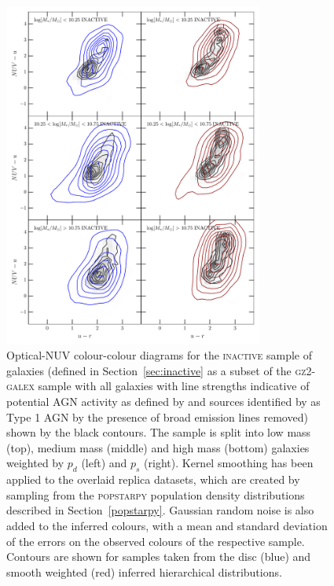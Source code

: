 \begin{figure}
\begin{centering}
\includegraphics[width=0.76\textwidth]{starpy/figc3b.pdf}
\caption[Replica colour-colour distributions using the \textsc{popstarpy} method]{Optical-NUV colour-colour diagrams for the \textsc{inactive} {\minor sample of galaxies (defined in Section~\ref{sec:inactive} as a subset of the \textsc{gz2-galex} sample with all galaxies with line strengths indicative of potential AGN activity as defined by \citealt{kauffmann03b} and sources identified by \citealt{Oh15} as Type 1 AGN by the presence of broad emission lines removed)} shown by the black contours. The sample is split into low mass (top), medium mass (middle) and high mass (bottom) galaxies weighted by $p_d$ (left) and $p_s$ (right). Kernel smoothing has been applied to the overlaid replica datasets, which are created by sampling from the \textsc{popstarpy} population density distributions described in Section~\ref{popstarpy}. Gaussian random noise is also added to the inferred colours, with a mean and standard deviation of the errors on the observed colours of the respective sample. Contours are shown for samples taken from the disc (blue) and smooth weighted (red) inferred hierarchical distributions.}
\label{replicapop}
\end{centering}
\end{figure}

